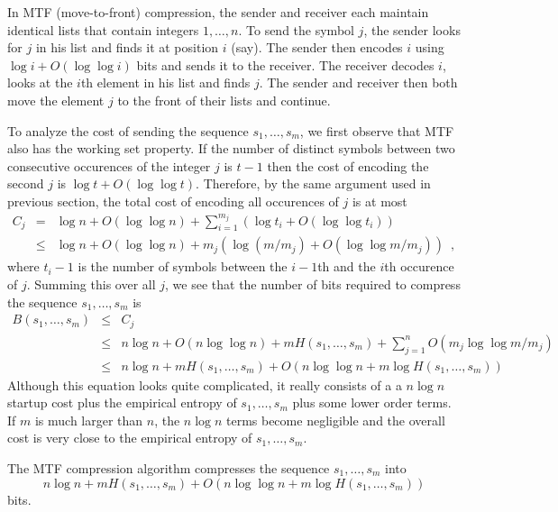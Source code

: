In MTF (move-to-front) compression, the sender and receiver each
maintain identical lists that contain integers $1,\ldots,n$.  To send
the symbol $j$, the sender looks for $j$ in his list and finds it at
position $i$ (say).  The sender then encodes $i$ using $\log
i+O(\log\log i)$ bits and sends it to the receiver.  The receiver
decodes $i$, looks at the $i$th element in his list and finds $j$.
The sender and receiver then both move the element $j$ to the front of
their lists and continue.

To analyze the cost of sending the sequence $s_1,\ldots,s_m$, we first
observe that MTF also has the working set property.  If the number of
distinct symbols between two consecutive occurences of the integer
$j$ is $t-1$ then the cost of encoding the second $j$ is $\log t +
O(\log\log t)$.  Therefore, by the same argument used in previous section,
the total cost of encoding all occurences of $j$ is at most
\begin{eqnarray*}
  C_j & = &\log n + O(\log\log n) + \sum_{i=1}^{m_j} \left(\log t_i +
  O(\log\log t_i)\right) \\
  & \le & \log n + O(\log\log n) + m_j\left(\log (m/m_j) + O(\log\log m/m_j)\right) \enspace , 
\end{eqnarray*}
where $t_i-1$ is the number of symbols between the $i-1$th and the
$i$th occurence of $j$.  Summing this over all $j$, we see that the
number of bits required to compress the sequence $s_1,\ldots,s_m$ is
\begin{eqnarray*}
B(s_1,\ldots,s_m) 
  & \le & C_j \\ 
  & \le & n\log n + O(n\log\log n) + mH(s_1,\ldots,s_m) + \sum_{j=1}^n O(m_j\log\log m/m_j) \\
  & \le & n\log n + mH(s_1,\ldots,s_m) + O(n\log\log n + m\log H(s_1,\ldots,s_m)) 
\end{eqnarray*}
Although this equation looks quite complicated, it really consists of
a a $n\log n$ startup cost plus the empirical entropy of
$s_1,\ldots,s_m$ plus some lower order terms.  If $m$ is much larger
than $n$, the $n\log n$ terms become negligible and the overall cost
is very close to the empirical entropy of $s_1,\ldots,s_m$.

\begin{thm}
The MTF compression algorithm compresses the sequence $s_1,\ldots,s_m$ into
\[
n\log n+ mH(s_1,\ldots,s_m) + O(n\log\log n + m \log H(s_1,\ldots,s_m)) 
\]
bits.
\end{thm}

